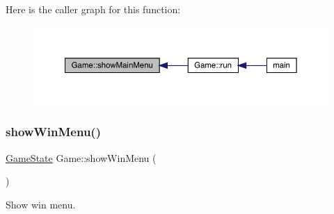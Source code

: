 Here is the caller graph for this function\+:
\nopagebreak
\begin{figure}[H]
\begin{center}
\leavevmode
\includegraphics[width=350pt]{class_game_a1bbeccf533a8d660ef5858c1f0cd08b6_icgraph}
\end{center}
\end{figure}
\mbox{\label{class_game_a02d7239b140618836f409b6926070f88}} 
\subsubsection{\texorpdfstring{show\+Win\+Menu()}{showWinMenu()}}
{\footnotesize\ttfamily \mbox{\hyperlink{_constants_8hpp_a7899b65f1ea0f655e4bbf8d2a5714285}{Game\+State}} Game\+::show\+Win\+Menu (\begin{DoxyParamCaption}{ }\end{DoxyParamCaption})}



Show win menu. 

